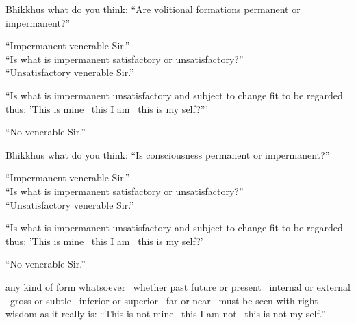 \begin{english-only-nohang}
  \begin{english-only-hang}
    Bhikkhus what do you think: ``Are volitional formations permanent or impermanent?''
  \end{english-only-hang}

  ``Impermanent venerable Sir.''\\

  ``Is what is impermanent satisfactory or unsatisfactory?'' \\

  ``Unsatisfactory venerable Sir.''\\

  \begin{english-hangtogether}
    ``Is what is impermanent unsatisfactory and subject to change fit to be regarded thus: 'This is mine \breathmark\ this I am \breathmark\ this is my self?'''
  \end{english-hangtogether}

  ``No venerable Sir.''
\end{english-only-nohang}

\begin{english-only-nohang}
  \begin{english-only-hang}
    Bhikkhus what do you think: ``Is consciousness permanent or impermanent?''
  \end{english-only-hang}

  ``Impermanent venerable Sir.''\\

  ``Is what is impermanent satisfactory or unsatisfactory?''\\

  ``Unsatisfactory venerable Sir.''\\

  \begin{english-hangtogether}
    ``Is what is impermanent unsatisfactory and subject to change fit to be regarded thus: 'This is mine \breathmark\ this I am \breathmark\ this is my self?'
  \end{english-hangtogether}

  ``No venerable Sir.''
\end{english-only-nohang}

\begin{english-only-hang}
   any kind of form whatsoever \breathmark\ whether past future or present \breathmark\ internal or external \breathmark\ gross or subtle \breathmark\ inferior or superior \breathmark\ far or near \breathmark\ must be seen with right wisdom as it really is: ``This is not mine \breathmark\ this I am not \breathmark\ this is not my self.''
\end{english-only-hang}

